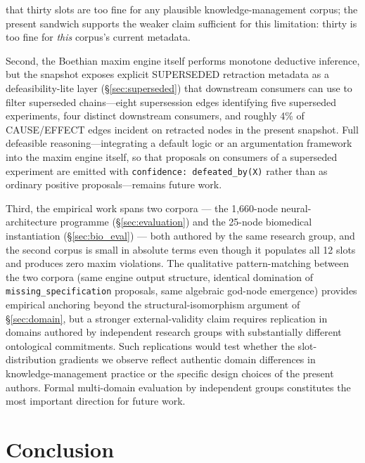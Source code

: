 \documentclass{iosart2x}
\begin{document}
that thirty slots are too fine for any plausible knowledge-management corpus; the present sandwich supports the weaker claim sufficient for this limitation: thirty is too fine for \emph{this} corpus's current metadata.

Second, the Boethian maxim engine itself performs monotone deductive inference, but the snapshot exposes explicit SUPERSEDED retraction metadata as a defeasibility-lite layer (\S\ref{sec:superseded}) that downstream consumers can use to filter superseded chains---eight supersession edges identifying five superseded experiments, four distinct downstream consumers, and roughly 4\% of CAUSE/EFFECT edges incident on retracted nodes in the present snapshot. Full defeasible reasoning---integrating a default logic or an argumentation framework into the maxim engine itself, so that proposals on consumers of a superseded experiment are emitted with \texttt{confidence: defeated\_by(X)} rather than as ordinary positive proposals---remains future work.

Third, the empirical work spans two corpora --- the 1,660-node neural-architecture programme (\S\ref{sec:evaluation}) and the 25-node biomedical instantiation (\S\ref{sec:bio_eval}) --- both authored by the same research group, and the second corpus is small in absolute terms even though it populates all 12 slots and produces zero maxim violations. The qualitative pattern-matching between the two corpora (same engine output structure, identical domination of \texttt{missing\_specification} proposals, same algebraic god-node emergence) provides empirical anchoring beyond the structural-isomorphism argument of \S\ref{sec:domain}, but a stronger external-validity claim requires replication in domains authored by independent research groups with substantially different ontological commitments. Such replications would test whether the slot-distribution gradients we observe reflect authentic domain differences in knowledge-management practice or the specific design choices of the present authors. Formal multi-domain evaluation by independent groups constitutes the most important direction for future work.

\section{Conclusion}
\label{sec:conclusion}
\end{document}
